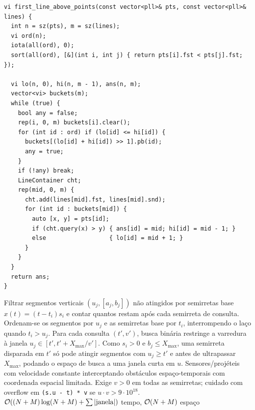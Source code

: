 \begin{lstlisting}
vi first_line_above_points(const vector<pll>& pts, const vector<pll>& lines) {
  int n = sz(pts), m = sz(lines);
  vi ord(n);
  iota(all(ord), 0);
  sort(all(ord), [&](int i, int j) { return pts[i].fst < pts[j].fst; });

  vi lo(n, 0), hi(n, m - 1), ans(n, m);
  vector<vi> buckets(m);
  while (true) {
    bool any = false;
    rep(i, 0, m) buckets[i].clear();
    for (int id : ord) if (lo[id] <= hi[id]) {
      buckets[(lo[id] + hi[id]) >> 1].pb(id);
      any = true;
    }
    if (!any) break;
    LineContainer cht;
    rep(mid, 0, m) {
      cht.add(lines[mid].fst, lines[mid].snd);
      for (int id : buckets[mid]) {
        auto [x, y] = pts[id];
        if (cht.query(x) > y) { ans[id] = mid; hi[id] = mid - 1; }
        else                  { lo[id] = mid + 1; }
      }
    }
  }
  return ans;
}
\end{lstlisting}

\algobox
  {Filtrar segmentos verticais $(u_j, [a_j, b_j])$ não atingidos por semirretas base $x(t) = (t - t_i)s_i$ e contar quantos restam após cada semirreta de consulta.}
  {Ordenam-se os segmentos por $u_j$ e as semirretas base por $t_i$, interrompendo o laço quando $t_i > u_j$. Para cada consulta $(t', v')$, busca binária restringe a varredura à janela $u_j \in [t', t' + X_{\max} / v']$.}
  {Como $s_i > 0$ e $b_j \le X_{\max}$, uma semirreta disparada em $t'$ só pode atingir segmentos com $u_j \ge t'$ e antes de ultrapassar $X_{\max}$, podando o espaço de busca a uma janela curta em $u$.}
  {Sensores/projéteis com velocidade constante interceptando obstáculos espaço-temporais com coordenada espacial limitada.}
  {Exige $v > 0$ em todas as semirretas; cuidado com overflow em \texttt{(s.u - t) * v} se $u \cdot v > 9 \cdot 10^{18}$.}
  {$\mathcal{O}((N + M) \log(N + M) + \sum |\text{janela}|)$ tempo, $\mathcal{O}(N + M)$ espaço}

